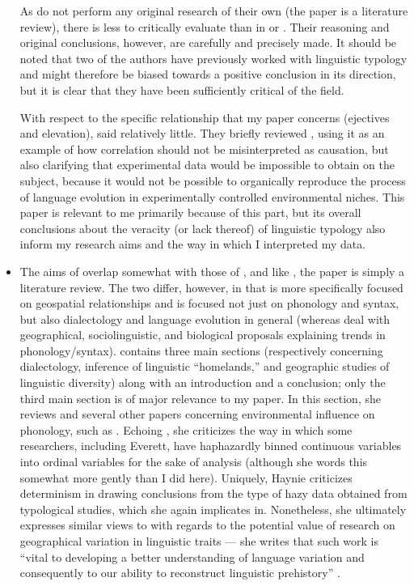\documentclass{article}
\begin{document}
\begin{itemize}
As \textcite{ladd2015} do not perform any original research of their own (the paper is a literature review), there is less to critically evaluate than in \textcite{everett2013} or \textcite{urban2021}. Their reasoning and original conclusions, however, are carefully and precisely made. It should be noted that two of the authors have previously worked with linguistic typology and might therefore be biased towards a positive conclusion in its direction, but it is clear that they have been sufficiently critical of the field.

With respect to the specific relationship that my paper concerns (ejectives and elevation), \textcite{ladd2015} said relatively little. They briefly reviewed \textcite{everett2013}, using it as an example of how correlation should not be misinterpreted as causation, but also clarifying that experimental data would be impossible to obtain on the subject, because it would not be possible to organically reproduce the process of language evolution in experimentally controlled environmental niches. This paper is relevant to me primarily because of this part, but its overall conclusions about the veracity (or lack thereof) of linguistic typology also inform my research aims and the way in which I interpreted my data.

\item \textbf{}

The aims of \textcite{haynie2014} overlap somewhat with those of \textcite{ladd2015}, and like \textcite{ladd2015}, the paper is simply a literature review. The two differ, however, in that \textcite{haynie2014} is more specifically focused on geospatial relationships and is focused not just on phonology and syntax, but also dialectology and language evolution in general (whereas \cite{ladd2015} deal with geographical, sociolinguistic, and biological proposals explaining trends in phonology/syntax). \textcite{haynie2014} contains three main sections (respectively concerning dialectology, inference of linguistic ``homelands,'' and geographic studies of linguistic diversity) along with an introduction and a conclusion; only the third main section is of major relevance to my paper. In this section, she reviews \textcite{everett2013} and several other papers concerning environmental influence on phonology, such as \textcite{fought2004}. Echoing \textcite{hammarstroem2013}, she criticizes the way in which some researchers, including Everett, have haphazardly binned continuous variables into ordinal variables for the sake of analysis (although she words this somewhat more gently than I did here). Uniquely, Haynie criticizes determinism in drawing conclusions from the type of hazy data obtained from typological studies, which she again implicates \textcite{everett2013} in. Nonetheless, she ultimately expresses similar views to \textcite{ladd2015} with regards to the potential value of research on geographical variation in linguistic traits --- she writes that such work is ``vital to developing a better understanding of language variation and consequently to our ability to reconstruct linguistic prehistory'' \parencite[352]{haynie2014}.


\end{itemize}
\end{document}

